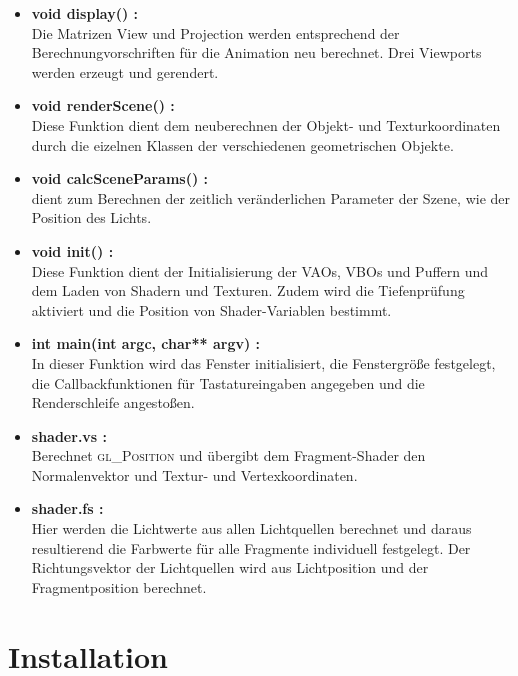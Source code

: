 \documentclass{scrartcl}
\begin{document}
\begin{itemize}
	\item \textbf{void display() :} \\
	Die Matrizen View und Projection werden entsprechend der Berechnungvorschriften für die Animation neu berechnet.
	Drei Viewports werden erzeugt und gerendert.
	
	\item \textbf{void renderScene() :} \\
	Diese Funktion dient dem neuberechnen der Objekt- und Texturkoordinaten durch die eizelnen Klassen der verschiedenen geometrischen Objekte.
	
	\item \textbf{void calcSceneParams() :} \\
	dient zum Berechnen der zeitlich veränderlichen Parameter der Szene, wie der Position des Lichts.
	
	\item \textbf{void init() :} \\
	Diese Funktion dient der Initialisierung der VAOs, VBOs und Puffern und dem Laden von Shadern und Texturen. Zudem wird die Tiefenprüfung aktiviert und die Position von Shader-Variablen bestimmt.
	
	\item \textbf{int main(int argc, char** argv) :} \\
	In dieser Funktion wird das Fenster initialisiert, die Fenstergröße festgelegt, die Callbackfunktionen für Tastatureingaben angegeben und die Renderschleife angestoßen.
		
	\item \textbf{shader.vs :} \\
	Berechnet \textsc{gl\_Position} und übergibt dem Fragment-Shader den Normalenvektor und Textur- und Vertexkoordinaten.

	\item \textbf{shader.fs :} \\
	Hier werden die Lichtwerte aus allen Lichtquellen berechnet und daraus resultierend die Farbwerte für alle Fragmente individuell festgelegt. Der Richtungsvektor der Lichtquellen wird aus Lichtposition und der Fragmentposition berechnet.

\end{itemize}

\section{Installation}
\end{document}
